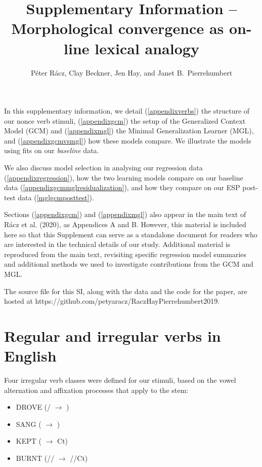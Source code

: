 \documentclass[12pt]{article}
\title{Supplementary Information -- Morphological convergence as on-line lexical analogy}
\author{P\'eter R\'acz, Clay Beckner, Jen Hay, and Janet B.\ Pierrehumbert}
\begin{document}



\maketitle

\noindent In this supplementary information, we detail (\ref{appendixverbs}) the structure of our nonce verb stimuli, (\ref{appendixgcm}) the setup of the Generalized Context Model (GCM) and (\ref{appendixmgl}) the Minimal Generalization Learner (MGL), and (\ref{appendixgcmvsmgl}) how these models compare. We illustrate the models using fits on our \emph {baseline} data. 

We also discuss model selection in analysing our regression data (\ref{appendixregression}), how the two learning models compare on our baseline data (\ref{appendixgcmmglresidualization}), and how they compare on our ESP post-test data (\ref{mglgcmposttest}). 

Sections (\ref{appendixgcm}) and (\ref{appendixmgl}) also appear in the main text of  R\'acz et al. (2020), as Appendices A and B. However, this material is included here so that this Supplement can serve as a standalone document for readers who are interested in the technical details of our study. Additional material is reproduced from the main text, revisiting specific regression model summaries and additional methods we used to investigate contributions from the GCM and MGL.

The source file for this SI, along with the data and the code for the paper, are hosted at https://github.com/petyaracz/RaczHayPierrehumbert2019.

\section{Regular and irregular verbs in English \label{appendixverbs}}

Four irregular verb classes were defined for our stimuli, based on the vowel alternation and affixation processes that apply to the stem:

\begin{itemize}
    \item DROVE (\textipa{[aI]}/\textipa{[i]} $\rightarrow{}$ \textipa{[oU]})
    \item SANG (\textipa{[I]} $\rightarrow{}$ \textipa{[\ae]})
    \item KEPT (\textipa{[i]} $\rightarrow{}$ \textipa{[E]}Ct)
    \item BURNT (\textipa{[3]}/\textipa{[E]}/\textipa{[I]} $\rightarrow{}$ \textipa{[3]}/\textipa{[E]}/\textipa{[I]}Ct)
\end{itemize}
\end{document}

